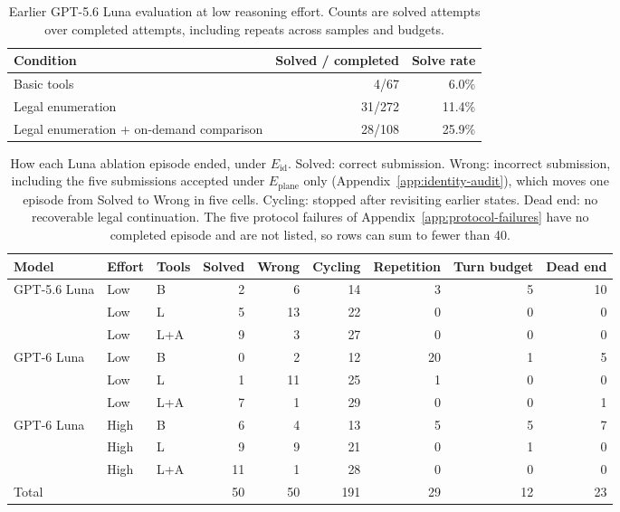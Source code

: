 \begin{table}[htbp]
\centering
\caption{Earlier GPT-5.6 Luna evaluation at low reasoning effort. Counts are solved
attempts over completed attempts, including repeats across samples and budgets.}
\label{tab:headline}
\begin{tabular}{lrr}
\hline
Condition & Solved / completed & Solve rate \\
\hline
Basic tools & 4/67 & 6.0\% \\
Legal enumeration & 31/272 & 11.4\% \\
Legal enumeration + on-demand comparison & 28/108 & 25.9\% \\
\hline
\end{tabular}
\end{table}

\begin{table}[htbp]
\centering
\caption{How each Luna ablation episode ended, under $E_{\mathrm{id}}$. Solved: correct submission. Wrong:
incorrect submission, including the five submissions accepted under $E_{\mathrm{plane}}$ only
(Appendix~\ref{app:identity-audit}), which moves one episode from Solved to Wrong in five cells. Cycling: stopped after revisiting earlier states. Dead end: no recoverable legal
continuation. The five protocol failures of Appendix~\ref{app:protocol-failures} have no
completed episode and are not listed, so rows can sum to fewer than 40.}
\label{tab:ablation-terminations}
\small
\setlength{\tabcolsep}{4pt}
\begin{tabular}{lllrrrrrr}
\hline
Model & Effort & Tools & Solved & Wrong & Cycling & Repetition & Turn budget & Dead end \\
\hline
GPT-5.6 Luna & Low & B & 2 & 6 & 14 & 3 & 5 & 10 \\
 & Low & L & 5 & 13 & 22 & 0 & 0 & 0 \\
 & Low & L+A & 9 & 3 & 27 & 0 & 0 & 0 \\
\hline
GPT-6 Luna & Low & B & 0 & 2 & 12 & 20 & 1 & 5 \\
 & Low & L & 1 & 11 & 25 & 1 & 0 & 0 \\
 & Low & L+A & 7 & 1 & 29 & 0 & 0 & 1 \\
\hline
GPT-6 Luna & High & B & 6 & 4 & 13 & 5 & 5 & 7 \\
 & High & L & 9 & 9 & 21 & 0 & 1 & 0 \\
 & High & L+A & 11 & 1 & 28 & 0 & 0 & 0 \\
\hline
Total & & & 50 & 50 & 191 & 29 & 12 & 23 \\
\hline
\end{tabular}
\end{table}

